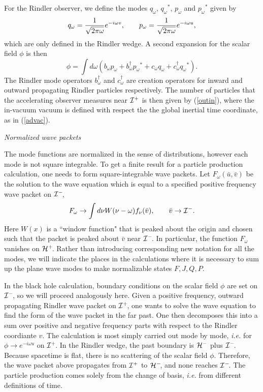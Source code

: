 \documentclass[12pt]{article}
\newcommand{\be}{\begin{equation}}
\newcommand{\ee}{\end{equation}}
\newcommand{\p}{\partial}
\def\fh{{\cal H}^+}
\def\ph{{\cal H}^-}
\def\finf{{\cal I}^+}
\def\pinf{{\cal I}^-}
\def\p{p_{\omega}}
\def\q{q_{\omega}}
\def\b{b_{\omega}}
\def\bd{b^{\dagger}_{\omega} }
\def\c{c_{\omega}}
\def\cd{c^{\dagger}_{\omega} }
\def\ub{\bar u}
\def\vb{\bar v}
\begin{document}
%



For the Rindler observer, we define the modes $\q$, $\q{}^*$,
$\p$ and $\p{}^*$ given by
%
\be\label{rinmode} \q ={1\over \sqrt{2\pi \omega} }e^{-i\omega v } ,\qquad
\p = {1\over \sqrt{2\pi \omega} }e^{-i\omega u } ,\ee
%
which are only defined in the Rindler wedge.
A second expansion for the scalar field $\phi$ is then
%
\be\label{rinphitwo}\phi = \int d\omega ( \b \p + \b^{\dagger} \p{}^*  +
\c \q + \c^{\dagger} \q{}^* ). \ee
%
The Rindler mode operators $\bd$ and $\cd$ are creation operators for
inward and outward propagating Rindler particles respectively. The number
of particles that
the accelerating observer measures near $\finf$ is then given by
(\ref{outin}),  where the
in-vacuum vacuum is  defined with respect the the global inertial time
coordinate, as in
(\ref{advac}).

\vskip 0.1in\noindent
{\it Normalized wave packets}
\vskip 0.05in

The mode functions are normalized in the sense of distributions,
however each mode is not square integrable. To get a finite result for a
particle production calculation, one needs to form square-integrable wave
packets.
Let $F_{\omega}(\ub ,\vb )$ be the solution to the wave equation which is
equal to  a specified positive frequency wave packet on $\pinf\!$,
%
\be\label{packet}F_{\omega}\rightarrow \int d\nu W(\nu -\omega )f_{\nu}
(\vb ),\qquad
\vb \rightarrow \pinf.\ee
%
Here $W(x)$ is a ``window function" that is
peaked about the origin and chosen such that the packet is peaked
about $\vb$ near $\pinf\!$. In particular, the function $F_{\omega}$ vanishes
on $\fh\!$.
Rather than introducing corresponding new notation for all the modes, we
will indicate the
places in the calculations where it is necessary to sum up the plane wave
modes to make
normalizable states $F,J,Q,P$.

In the black hole calculation, boundary conditions on the
scalar field $\phi$ are set on $\pinf\!$, so we will proceed analogously here.
Given a positive frequency, outward propagating Rindler wave packet on $\finf\!$,
one wants to solve the wave equation to find the form of the wave packet in
the far past.
One then decomposes this into a sum over positive and negative frequency
parts with respect
to the Rindler coordiante $v$. The calculation is most simply carried out
mode by mode, {\it i.e.} for $\phi \rightarrow  e^{-i\omega u}$ on $\finf\!$.
In the
Rindler wedge, the past boundary is $\ph$ plus $\pinf\!$. Because spacetime
is flat, there is
no scattering of the scalar field $\phi$. Therefore, the wave packet above
propagates from $\finf$ to $\ph\!$, and none reaches $\pinf\!$.  The particle
production comes
solely from the change of basis, {\it i.e.} from different definitions of time.
\end{document}
